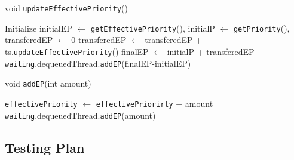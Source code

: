 \documentclass{article}
\begin{document}
\begin{spacing}{1.1}
\begin{algorithm}
  \caption{void \texttt{updateEffectivePriority}()}
\begin{algorithmic}[1]
  \STATE Initialize initialEP $\leftarrow$ \texttt{getEffectivePriority}(), initialP $\leftarrow$ \texttt{getPriority}(), transferedEP $\leftarrow$ 0
      \STATE transferedEP $\leftarrow$ transferedEP + ts.\texttt{updateEffectivePriority}()
    \ENDFOR
  \ENDFOR
  \STATE finalEP $\leftarrow$ initialP + transferedEP
  \STATE \texttt{waiting}.dequeuedThread.\texttt{addEP}(finalEP-initialEP)
\end{algorithmic}
\end{algorithm}

\begin{algorithm}
  \caption{void \texttt{addEP}(int amount)}
\begin{algorithmic}[1]
  \STATE  \texttt{effectivePriority} $\leftarrow$ \texttt{effectivePriorirty} + amount
  \STATE \texttt{waiting}.dequeuedThread.\texttt{addEP}(amount)
\end{algorithmic}
\end{algorithm}


\subsection{Testing Plan}


\end{spacing}
\end{document}
